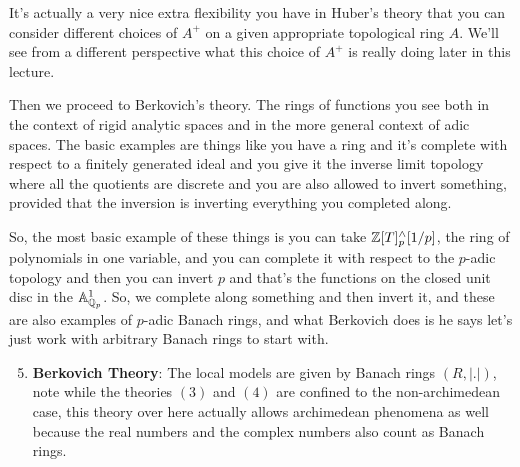 It's actually a very nice extra flexibility you have in Huber's theory that you can consider different choices of $A^+$ on a given appropriate topological ring $A$. We'll see from a different perspective what this choice of $A^+$ is really doing later in this lecture.



 Then we proceed to Berkovich's theory. The rings of functions you see both in the context of rigid analytic spaces and in the more general context of adic spaces. The basic examples are things like you have a ring and it's complete with respect to a finitely generated ideal and you give it the inverse limit topology where all the quotients are discrete and you are also allowed to invert something, provided that the inversion is inverting everything you completed along.

 So, the most basic example of these things is you can take $\Bbb{Z}[T]^{\wedge}_{p}[1/p]$, the ring of polynomials in one variable, and you can complete it with respect to the $p$-adic topology and then you can invert $p$ and that's the functions on the closed unit disc in the $\mathbb{A}^1_{\Bbb{Q}_p}$. So, we complete along something and then invert it, and these are also examples of $p$-adic Banach rings, and what Berkovich does is he says let's just work with arbitrary Banach rings to start with.
 
\begin{enumerate}
    \setcounter{enumi}{4} 
    \item \textbf{Berkovich Theory}: The local models are given by Banach rings $(R, |.|)$, note while the theories $(3)$ and $(4)$ are confined to the non-archimedean case, this theory over here actually allows archimedean phenomena as well because the real numbers and the complex numbers also count as Banach rings.
\end{enumerate}

